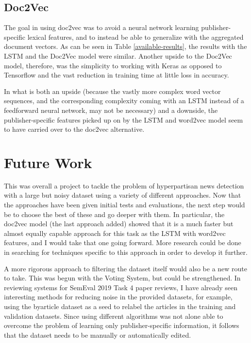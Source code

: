 \documentclass[11pt, a4paper]{article}
\begin{document}
\subsection{Doc2Vec}

The goal in using doc2vec was to avoid a neural network learning publisher-specific lexical features, and to instead be able to generalize with the aggregated document vectors. As can be seen in Table \ref{available-results}, the results with the LSTM and the Doc2Vec model were similar. Another upside to the Doc2Vec model, therefore, was the simplicity to working with Keras as opposed to Tensorflow and the vast reduction in training time at little loss in accuracy.

In what is both an upside (because the vastly more complex word vector sequences, and the corresponding complexity coming with an LSTM instead of a feedforward neural network, may not be necessary) and a downside, the publisher-specific features picked up on by the LSTM and word2vec model seem to have carried over to the doc2vec alternative.

\section{Future Work}

This was overall a project to tackle the problem of hyperpartisan news detection with a large but noisy dataset using a variety of different approaches. Now that the approaches have been given initial tests and evaluations, the next step would be to choose the best of these and go deeper with them. In particular, the doc2vec model (the last approach added) showed that it is a much faster but almost equally capable approach for this task as the LSTM with word2vec features, and I would take that one going forward. More research could be done in searching for techniques specific to this approach in order to develop it further.

A more rigorous approach to filtering the dataset itself would also be a new route to take. This was begun with the Voting System, but could be strengthened. In reviewing systems for SemEval 2019 Task 4 paper reviews, I have already seen interesting methods for reducing noise in the provided datasets, for example, using the byarticle dataset as a seed to relabel the articles in the training and validation datasets. Since using different algorithms was not alone able to overcome the problem of learning only publisher-specific information, it follows that the dataset needs to be manually or automatically edited.
\end{document}
